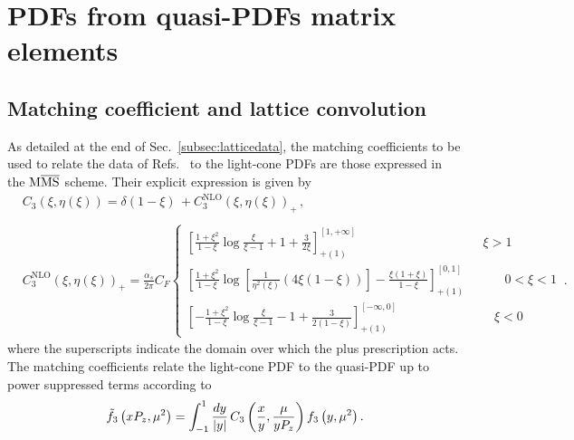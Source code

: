 \chapter{PDFs from quasi-PDFs matrix elements}
%
\section{Matching coefficient and lattice convolution}
\label{app:coefficients}
As detailed at the end of Sec.~\ref{subsec:latticedata}, the matching coefficients to be
used to relate the data of Refs.~\cite{Alexandrou:2018pbm,Alexandrou:2019lfo} to the light-cone PDFs
are those expressed in the ${\rm M}\overline{\mathrm{MS}}$ scheme. Their explicit expression is given
by \cite{Alexandrou:2018pbm,Alexandrou:2019lfo}
\begin{equation}
	\label{eq::matching}
	\begin{split}
		&C_{3}\left(\xi,\eta\left(\xi\right) \right)= \delta\left(1-\xi\right)\, +  C_{3}^{\text{NLO}}\left(\xi,\eta\left(\xi\right) \right)_+\,,  \\ \\ 
		& C_{3}^{\text{NLO}}\left(\xi,\eta\left(\xi\right) \right)_+ =  \frac{\alpha_s}{2\pi}C_F \begin{cases} \left[\frac{1+\xi^2}{1-\xi}\log{\frac{\xi}{\xi-1}} + 1 + \frac{3}{2\xi}\right]^{\left[1,+\infty\right]}_{+(1)} \,\,\,\,\,\,\,\,\,\,\,\,\,\,\,\,\,\,\,\,\,\,\,\,\,\,\,\,\,\,\,\,\,\,\,\,\,\,\,\,\,\,\,\,\,\,\,\,\,\,\,\,\,\,\,\,\,\,\,\, \xi > 1\\ \left[\frac{1+\xi^2}{1-\xi}\log\left[{\frac{1}{\eta^2\left(\xi\right)}}\left(4\xi\left(1-\xi\right)\right)\right]  -\frac{\xi\left(1+\xi\right)}{1-\xi}\right]^{\left[0,1\right]}_{+(1)}\,\,\,\,\,\,\,\,\,\,\,\,\,\,\,\,\,\,\, 0<\xi < 1 \\ \left[-\frac{1+\xi^2}{1-\xi}\log{\frac{\xi}{\xi-1}} - 1 + \frac{3}{2\left(1-\xi\right)}\right]^{\left[-\infty,0\right]}_{+(1)} \,\,\,\,\,\,\,\,\,\,\,\,\,\,\,\,\,\,\,\,\,\,\,\,\,\,\,\,\,\,\,\,\,\,\,\,\,\,\,\,\,\,\,\,\,\, \xi<0\end{cases}\, .
	\end{split}
\end{equation}
where the superscripts indicate the domain over which the plus prescription acts.
The matching coefficients relate the light-cone PDF to the quasi-PDF up to power suppressed terms
according to
\begin{align}
	\label{eq::matchingfud}                                   
	\tilde{f}_{3}\left( x P_z, {\mu}^2 \right) =              
	\int_{-1}^{1} \frac{dy}{|y|}\, C_{3}\left(\frac{x}{y},\frac{\mu}{y P_z}\right)  
	f_{3}\left( y, {\mu}^2\right). 
\end{align}
